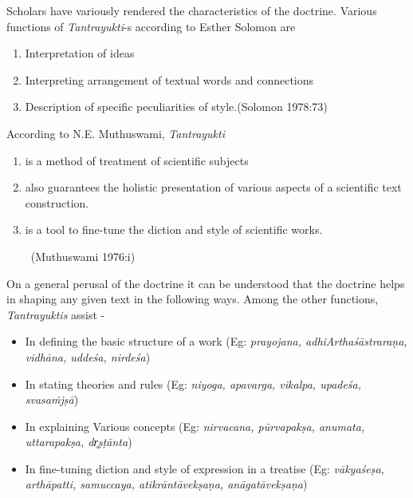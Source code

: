Scholars have variously rendered the characteristics of the doctrine. Various functions of \textit{Tantrayukti}-s according to Esther Solomon are

\begin{enumerate}[{\rm a.}]
\itemsep=0pt
\item Interpretation of ideas

 \item Interpreting arrangement of textual words and connections

 \item Description of specific peculiarities of style.\hfill (Solomon 1978:73)

\end{enumerate}

According to N.E. Muthuswami, \textit{Tantrayukti}

\begin{enumerate}[{\rm i)}]
\itemsep=0pt
\item is a method of treatment of scientific subjects

 \item also guarantees the holistic presentation of various aspects of a scientific text construction.

 \item is a tool to fine-tune the diction and style of scientific works.

~\hfill (Muthuswami 1976:i)

\end{enumerate}

On a general perusal of the doctrine it can be understood that the doctrine helps in shaping any given text in the following ways. Among the other functions, \textit{Tantrayuktis} assist -

\begin{itemize}
\item In defining the basic structure of a work (Eg: \textit{prayojana, adhiArthaśāstraraṇa, vidhāna, uddeśa, nirdeśa})

 \item In stating theories and rules (Eg: \textit{niyoga, apavarga, vikalpa, upadeśa, svasaṁjṣā})

 \item In explaining Various concepts (Eg: \textit{nirvacana, pūrvapakṣa, anumata, uttarapakṣa, dr̥ṣṭānta})

 \item In fine-tuning diction and style of expression in a treatise (Eg: \textit{vākyaśeṣa, arthāpatti, samuccaya, atikrāntāvekṣaṇa, anāgatāvekṣaṇa})

\end{itemize}

